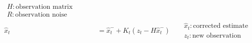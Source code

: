 \documentclass[a4paper]{article}
\begin{document}
\[\begin{aligned}
\begin{array}{l}
                H: \text{observation matrix} \\
                R: \text{observation noise covariance}
            \end{array}
            \\[8pt]
            \hat{x}_{t}
            &=
            \hat{x}^{-}_{t}
            +
            K_{t}
            \left(
                z_{t}
                -
                H\hat{x}^{-}_{t}
            \right)
            &&
            \begin{array}{l}
                \hat{x}_{t}: \text{corrected estimate} \\
                z_{t}: \text{new observation}
            \end{array}
        \end{aligned}
    \]
    
    
\end{document}
